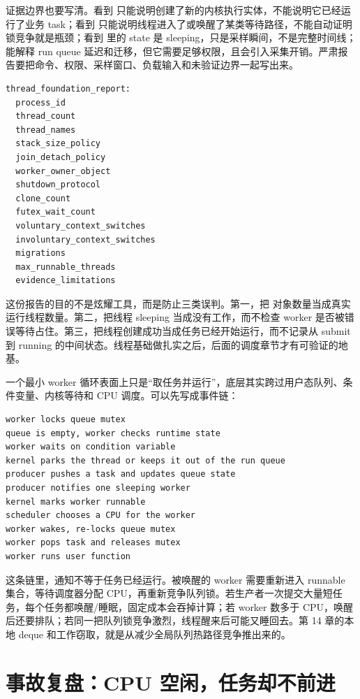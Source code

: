 证据边界也要写清。看到  只能说明创建了新的内核执行实体，不能说明它已经运行了业务 task；看到  只能说明线程进入了或唤醒了某类等待路径，不能自动证明锁竞争就是瓶颈；看到  里的 state 是 sleeping，只是采样瞬间，不是完整时间线； 能解释 run queue 延迟和迁移，但它需要足够权限，且会引入采集开销。严肃报告要把命令、权限、采样窗口、负载输入和未验证边界一起写出来。

\begin{lstlisting}[numbers=none,caption={线程基础报告字段}]
thread_foundation_report:
  process_id
  thread_count
  thread_names
  stack_size_policy
  join_detach_policy
  worker_owner_object
  shutdown_protocol
  clone_count
  futex_wait_count
  voluntary_context_switches
  involuntary_context_switches
  migrations
  max_runnable_threads
  evidence_limitations
\end{lstlisting}

这份报告的目的不是炫耀工具，而是防止三类误判。第一，把  对象数量当成真实运行线程数量。第二，把线程 sleeping 当成没有工作，而不检查 worker 是否被错误等待占住。第三，把线程创建成功当成任务已经开始运行，而不记录从 submit 到 running 的中间状态。线程基础做扎实之后，后面的调度章节才有可验证的地基。

一个最小 worker 循环表面上只是“取任务并运行”，底层其实跨过用户态队列、条件变量、内核等待和 CPU 调度。可以先写成事件链：

\begin{lstlisting}[numbers=none,caption={worker 从空闲到执行任务的事件链}]
worker locks queue mutex
queue is empty, worker checks runtime state
worker waits on condition variable
kernel parks the thread or keeps it out of the run queue
producer pushes a task and updates queue state
producer notifies one sleeping worker
kernel marks worker runnable
scheduler chooses a CPU for the worker
worker wakes, re-locks queue mutex
worker pops task and releases mutex
worker runs user function
\end{lstlisting}

这条链里，通知不等于任务已经运行。被唤醒的 worker 需要重新进入 runnable 集合，等待调度器分配 CPU，再重新竞争队列锁。若生产者一次提交大量短任务，每个任务都唤醒/睡眠，固定成本会吞掉计算；若 worker 数多于 CPU，唤醒后还要排队；若同一把队列锁竞争激烈，线程醒来后可能又睡回去。第 14 章的本地 deque 和工作窃取，就是从减少全局队列热路径竞争推出来的。

\section{事故复盘：CPU 空闲，任务却不前进}

